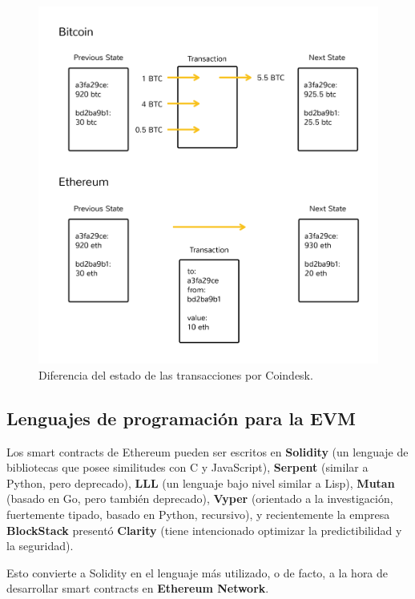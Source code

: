 \begin{figure}[h]
    \centering
    \includegraphics[scale=0.5]{images/statecoindesk.png}
    \caption{Diferencia del estado de las transacciones por Coindesk.}
    \label{fig:ethereum state transaction}
\end{figure}


\subsection{Lenguajes de programación para la EVM}
Los smart contracts de Ethereum pueden ser escritos en \textbf{Solidity}\cite{soliditylink} (un lenguaje de bibliotecas que posee similitudes con C y JavaScript), \textbf{Serpent}\cite{serpentlink} (similar a Python, pero deprecado), \textbf{LLL}\cite{llllink} (un lenguaje bajo nivel similar a Lisp), \textbf{Mutan}\cite{mutanlink} (basado en Go, pero también deprecado), \textbf{Vyper}\cite{vyperlink} (orientado a la investigación, fuertemente tipado, basado en Python, recursivo), y recientemente la empresa \textbf{BlockStack}\cite{blockstacklink} presentó \textbf{Clarity}\cite{claritylink} (tiene intencionado optimizar la predictibilidad y la seguridad).

Esto convierte a Solidity en el lenguaje más utilizado, o de facto, a la hora de desarrollar smart contracts en \textbf{Ethereum Network}\cite{ethereumhowlink}.



